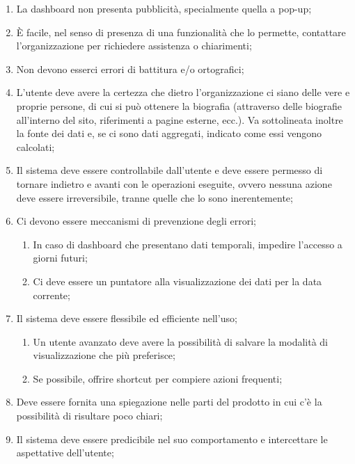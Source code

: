\begin{enumerate}
\begin{enumerate}[label=\alph*.]
    \end{enumerate}
    \item La dashboard non presenta pubblicità, specialmente quella a pop-up;\label{lg:21}
    \item \`E facile, nel senso di presenza di una funzionalità che lo permette, contattare l'organizzazione per richiedere assistenza o chiarimenti\label{lg:22};
    \item Non devono esserci errori di battitura e/o ortografici\label{lg:23};
    \item L'utente deve avere la certezza che dietro l'organizzazione ci siano delle vere e proprie persone, di cui si può ottenere la biografia (attraverso delle biografie all'interno del sito, riferimenti a pagine esterne, ecc.). Va sottolineata inoltre la fonte dei dati e, se ci sono dati aggregati, indicato come essi vengono calcolati;\label{lg:24}
    \item Il sistema deve essere controllabile dall'utente e deve essere permesso di tornare indietro e avanti con le operazioni eseguite, ovvero nessuna azione deve essere irreversibile, tranne quelle che lo sono inerentemente;\label{lg:25}
    \item Ci devono essere meccanismi di prevenzione degli errori;\label{lg:26}
    \begin{enumerate}[label=\alph*.]
        \item In caso di dashboard che presentano dati temporali, impedire l'accesso a giorni futuri;\label{lg:26.a}
        \item Ci deve essere un puntatore alla visualizzazione dei dati per la data corrente;\label{lg:26.b}
    \end{enumerate}
\item Il sistema deve essere flessibile ed efficiente nell'uso;\label{lg:27}
    \begin{enumerate}[label=\alph*.]
        \item Un utente avanzato deve avere la possibilità di salvare la modalità di visualizzazione che più preferisce;\label{lg:27.a}
        \item Se possibile, offrire shortcut per compiere azioni frequenti;\label{lg:27.b}
    \end{enumerate}
    \item Deve essere fornita una spiegazione nelle parti del prodotto in cui c'è la possibilità di risultare poco chiari;\label{lg:28}
    \item Il sistema deve essere predicibile nel suo comportamento e intercettare le aspettative dell'utente;\label{lg:29}

\end{enumerate}
